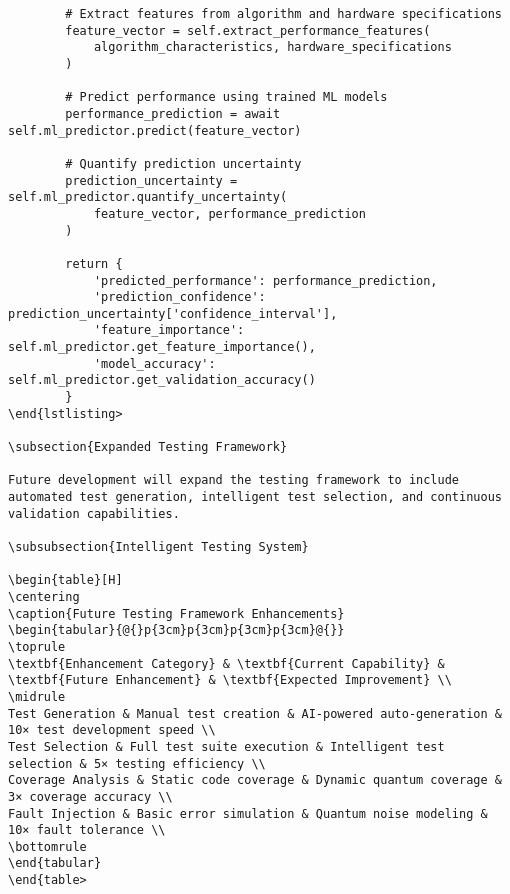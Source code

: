 \documentclass[12pt,a4paper]{report}
\begin{document}
\begin{lstlisting}
        # Extract features from algorithm and hardware specifications
        feature_vector = self.extract_performance_features(
            algorithm_characteristics, hardware_specifications
        )

        # Predict performance using trained ML models
        performance_prediction = await self.ml_predictor.predict(feature_vector)

        # Quantify prediction uncertainty
        prediction_uncertainty = self.ml_predictor.quantify_uncertainty(
            feature_vector, performance_prediction
        )

        return {
            'predicted_performance': performance_prediction,
            'prediction_confidence': prediction_uncertainty['confidence_interval'],
            'feature_importance': self.ml_predictor.get_feature_importance(),
            'model_accuracy': self.ml_predictor.get_validation_accuracy()
        }
\end{lstlisting>

\subsection{Expanded Testing Framework}

Future development will expand the testing framework to include automated test generation, intelligent test selection, and continuous validation capabilities.

\subsubsection{Intelligent Testing System}

\begin{table}[H]
\centering
\caption{Future Testing Framework Enhancements}
\begin{tabular}{@{}p{3cm}p{3cm}p{3cm}p{3cm}@{}}
\toprule
\textbf{Enhancement Category} & \textbf{Current Capability} & \textbf{Future Enhancement} & \textbf{Expected Improvement} \\
\midrule
Test Generation & Manual test creation & AI-powered auto-generation & 10× test development speed \\
Test Selection & Full test suite execution & Intelligent test selection & 5× testing efficiency \\
Coverage Analysis & Static code coverage & Dynamic quantum coverage & 3× coverage accuracy \\
Fault Injection & Basic error simulation & Quantum noise modeling & 10× fault tolerance \\
\bottomrule
\end{tabular}
\end{table>


\end{lstlisting}
\end{document}
